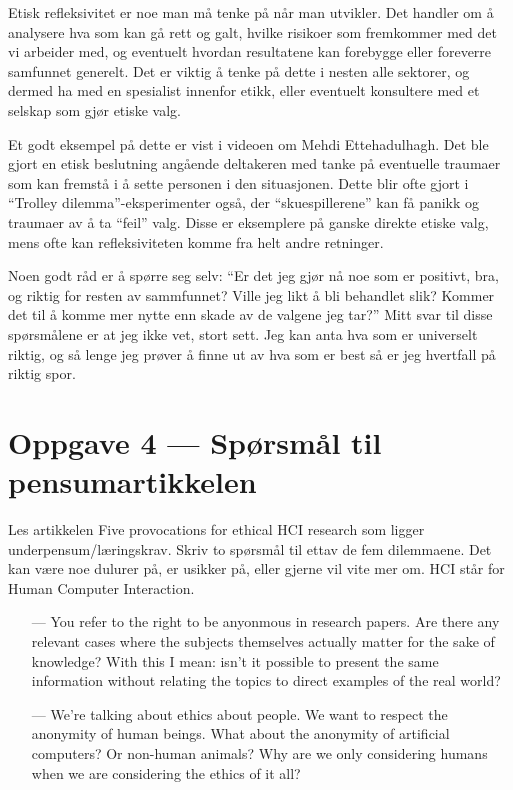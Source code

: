 \documentclass{../../myassignment}
\begin{document}
	\begin{answer}
		Etisk refleksivitet er noe man må tenke på når man utvikler. Det handler om å analysere hva som kan gå rett og galt, hvilke risikoer som fremkommer med det vi arbeider med, og eventuelt hvordan resultatene kan forebygge eller foreverre samfunnet generelt. Det er viktig å tenke på dette i nesten alle sektorer, og dermed ha med en spesialist innenfor etikk, eller eventuelt konsultere med et selskap som gjør etiske valg.

		Et godt eksempel på dette er vist i videoen om Mehdi Ettehadulhagh. Det ble gjort en etisk beslutning angående deltakeren med tanke på eventuelle traumaer som kan fremstå i å sette personen i den situasjonen. Dette blir ofte gjort i ``Trolley dilemma''-eksperimenter også, der ``skuespillerene'' kan få panikk og traumaer av å ta ``feil'' valg. Disse er eksemplere på ganske direkte etiske valg, mens ofte kan refleksiviteten komme fra helt andre retninger. 

		Noen godt råd er å spørre seg selv: ``Er det jeg gjør nå noe som er positivt, bra, og riktig for resten av sammfunnet? Ville jeg likt å bli behandlet slik? Kommer det til å komme mer nytte enn skade av de valgene jeg tar?'' Mitt svar til disse spørsmålene er at jeg ikke vet, stort sett. Jeg kan anta hva som er universelt riktig, og så lenge jeg prøver å finne ut av hva som er best så er jeg hvertfall på riktig spor. 
	\end{answer}

\newpage

\section*{Oppgave 4 --- Spørsmål til pensumartikkelen}
	\begin{problem}
		Les artikkelen Five provocations for ethical HCI research som ligger underpensum/læringskrav. Skriv to spørsmål til  ettav de fem dilemmaene. Det kan være noe dulurer på, er usikker på, eller gjerne vil vite mer om. HCI står for Human Computer Interaction.
	\end{problem}
	\begin{answer}
		\begin{itemize}
			\item [---] You refer to the right to be anyonmous in research papers. Are there any relevant cases where the subjects themselves actually matter for the sake of knowledge? With this I mean: isn't it possible to present the same information without relating the topics to direct examples of the real world?
			\item [---] We're talking about ethics about people. We want to respect the anonymity of human beings. What about the anonymity of artificial computers? Or non-human animals? Why are we only considering humans when we are considering the ethics of it all?
		\end{itemize}
	\end{answer}
\end{document}
